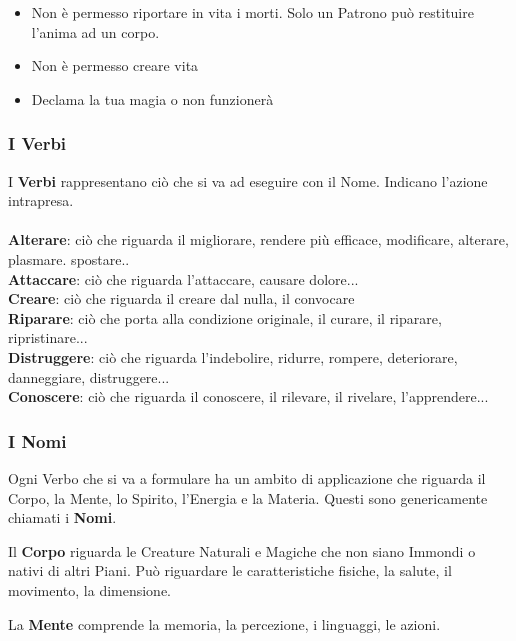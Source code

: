 \documentclass[a4paper,twoside,openany]{book}
\begin{document}
\begin{multicols}{2}
\begin{itemize}
\item Non è permesso riportare in vita i morti. Solo un Patrono può restituire l'anima ad un corpo.

\item Non è permesso creare vita

\item Declama la tua magia o non funzionerà

\end{itemize}

\subsubsection{I Verbi}

I \textbf{Verbi} rappresentano ciò che si va ad eseguire con il Nome. Indicano l'azione intrapresa.\\
~\\
\textbf{Alterare}: ciò che riguarda il migliorare, rendere più efficace, modificare, alterare, plasmare. spostare..\\
\textbf{Attaccare}: ciò che riguarda l'attaccare, causare dolore... \\
\textbf{Creare}: ciò che riguarda il creare dal nulla, il convocare\\
\textbf{Riparare}: ciò che porta alla condizione originale, il curare, il riparare, ripristinare...\\
\textbf{Distruggere}: ciò che riguarda l'indebolire, ridurre, rompere, deteriorare, danneggiare, distruggere...\\
\textbf{Conoscere}:	ciò che riguarda il conoscere, il rilevare, il rivelare, l'apprendere...\\


\subsubsection{I Nomi}

Ogni Verbo che si va a formulare ha un ambito di applicazione che riguarda il Corpo, la Mente, lo Spirito, l'Energia e la Materia. Questi sono genericamente chiamati i \textbf{Nomi}.

Il \textbf{Corpo} riguarda le Creature Naturali e Magiche che non siano Immondi o nativi di altri Piani. Può riguardare le caratteristiche fisiche, la salute, il movimento, la dimensione.

La \textbf{Mente} comprende la memoria, la percezione, i linguaggi, le azioni.


\end{multicols}
\end{document}
